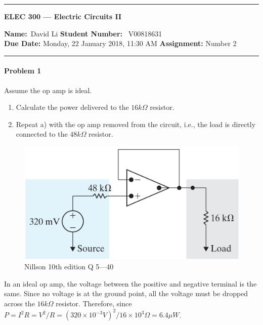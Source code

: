 \begin{center}
	\hrule
	\vspace{.4cm}
	{\textbf { \large ELEC 300 --- Electric Circuits II}}
\end{center}
{\textbf{Name:}\ David Li \hspace{\fill} \textbf{Student Number:}} \ V00818631  \\
{\textbf{Due Date:} Monday, 22 January 2018, 11:30 AM \hspace{\fill} \textbf{Assignment:} Number 2} \\
	\hrule
	
\paragraph{Problem 1}
Assume the op amp is ideal.
\begin{enumerate}[label=(\alph*)]
	\item Calculate the power delivered to the $16 k\Omega$ resistor.
	
	\item Repeat a) with the op amp removed from the circuit, i.e., the load is directly connected to
	the $48 k\Omega$ resistor.
\end{enumerate}

\begin{figure}[H]
	\centering
	\includegraphics[width=1\linewidth]{images/P1Nillson10thQ540.png}
	\caption{Nillson 10th edition Q 5---40}
	\label{fig:p1nillson10thq54}
\end{figure}
In an ideal op amp, the voltage between the positive and negative terminal is the same. Since no voltage is at the ground point, all the voltage must be dropped across the $16 k \Omega$ resistor. Therefore, since $P=I^2R=V^2/R= (320 \times 10 ^{-3} V)^2 / 16 \times 10^3 \Omega = 6.4 \mu W$.

